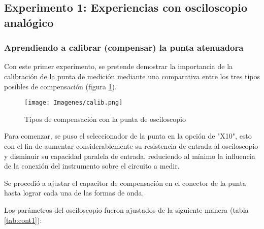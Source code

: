 \vspace{0.5cm}
\subsection{Experimento 1: Experiencias con osciloscopio analógico}

\vspace{0.5cm}
\subsubsection{Aprendiendo a calibrar (compensar) la punta atenuadora}

Con este primer experimento, se pretende demostrar la importancia de la calibración de la punta de medición mediante una comparativa entre los tres tipos posibles de compensación (figura \ref{calib}).


\begin{figure}[H]
    \centering
    \texttt{[image: Imagenes/calib.png]}
    \caption{Tipos de compensación con la punta de osciloscopio}
    \label{calib}
\end{figure}

Para comenzar, se puso el seleccionador de la punta en la opción de "X10", esto con el fin de aumentar considerablemente su resistencia de entrada al osciloscopio y disminuir su capacidad paralela de entrada, reduciendo al mínimo la influencia de la conexión del instrumento sobre el circuito a medir.

Se procedió a ajustar el capacitor de compensación en el conector de la punta hasta lograr cada una de las formas de onda. %

Los parámetros del osciloscopio fueron ajustados de la siguiente manera (tabla \ref{tab:cont1}):

\begin{table}[H]
    \centering
        \def\tablename{Tabla} 
        \caption{Cuadro de Controles}
        \label{tab:cont1}
\end{table}

